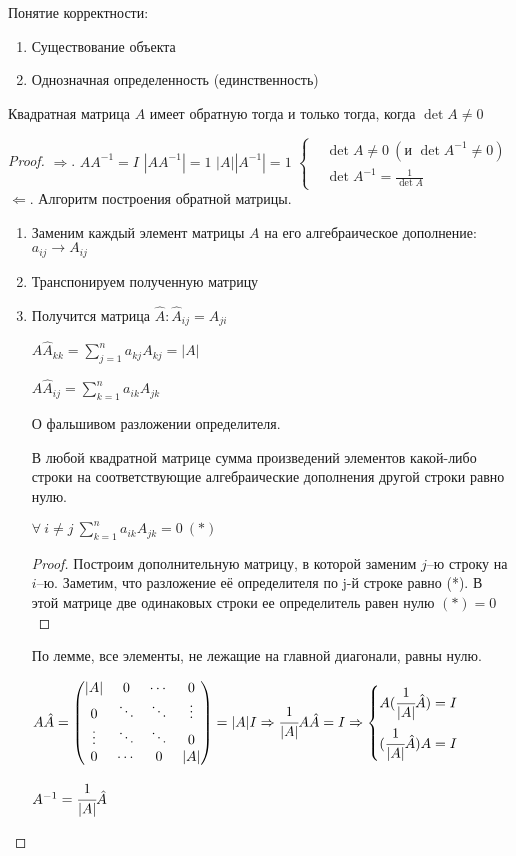 Понятие корректности:
\begin{enumerate}
\item Существование объекта
\item Однозначная определенность (единственность)
\end{enumerate}
\begin{theor}

Квадратная матрица $A$ имеет обратную тогда и только тогда, когда $\det A\neq0$
\end{theor}
\begin{proof}
$\Rightarrow$. $AA^{-1}=I$ \then $|AA^{-1}|=1$ \then $|A||A^{-1}|=1$ \then $\left\{\begin{aligned}
& \det A\neq 0\ (\mbox{и }\det A^{-1}\neq0) \\
& \det A^{-1}=\frac1{\det A}
\end{aligned}\right.$
$\Leftarrow$. Алгоритм построения обратной матрицы. \begin{enumerate}
\item Заменим каждый элемент матрицы $A$ на его алгебраическое дополнение: $a_{ij}\rightarrow{}A_{ij}$
\item Транспонируем полученную матрицу
\item Получится матрица $\hat{A}:\hat{A}_{ij}=A_{ji}$

${A\hat{A}}_{kk}=\sum\limits_{j=1}^na_{kj}A_{kj}=|A|$

${A\hat{A}}_{ij}=\sum\limits_{k=1}^na_{ik}A_{jk}$
\begin{lemma} О фальшивом разложении определителя.

В любой квадратной матрице сумма произведений элементов какой-либо строки на соответствующие алгебраические дополнения другой строки равно нулю.

$\forall\ i\neq{}j\ \sum\limits_{k=1}^na_{ik}A_{jk}=0\ (*)$
\end{lemma}
\begin{proof}
Построим дополнительную матрицу, в которой заменим $j$--ю строку на $i$--ю. Заметим, что разложение её определителя по j-й строке равно (*). В этой матрице две одинаковых строки \then ее определитель равен нулю \then $(*)=0$
\end{proof}
По лемме, все элементы, не лежащие на главной диагонали, равны нулю.

$A\hat{A}=\begin{pmatrix}
|A|    & 0      & \cdots & 0      \\
0      & \ddots & \ddots & \vdots \\
\vdots & \ddots & \ddots & 0      \\
0      & \cdots & 0      & |A|
\end{pmatrix}=|A|I \Rightarrow \cfrac1{|A|}A\hat{A}=I \Rightarrow \left\{\begin{aligned}
& A(\cfrac1{|A|}\hat{A})=I \\
& (\cfrac1{|A|}\hat{A})A=I
\end{aligned}\right.$

$A^{-1}=\cfrac1{|A|}\hat{A}$
\end{enumerate}
\end{proof}
